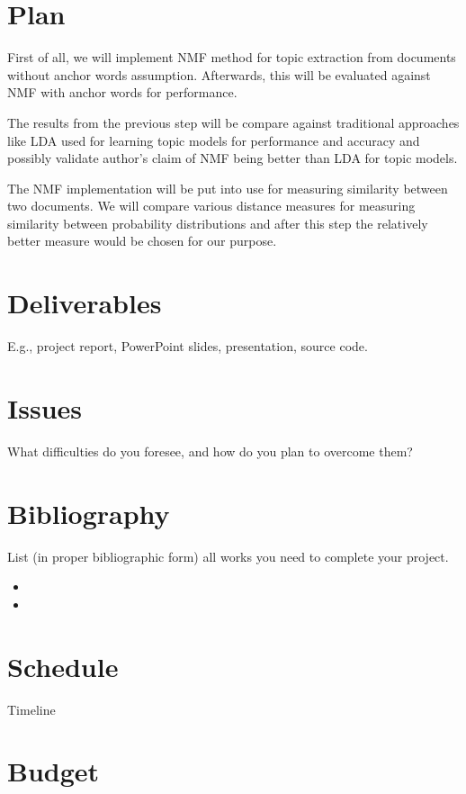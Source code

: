 \documentclass[a4paper,11pt]{article}
\begin{document}
\section{Plan}

First of all, we will implement NMF method for topic extraction from documents without anchor words assumption. Afterwards, this will be evaluated against NMF with anchor words for performance. 

The results from the previous step will be compare against traditional approaches like LDA used for learning topic models for performance and accuracy and possibly validate author's claim of NMF being better than LDA for topic models.

The NMF implementation will be put into use for measuring similarity between two documents. We will compare various distance measures for measuring similarity between probability distributions and after this step the relatively better measure would be chosen for our purpose.   

\section{Deliverables}

E.g., project report, PowerPoint slides, presentation, source code.

\section{Issues}
What difficulties do you foresee, and how do you plan to overcome them?

\section{Bibliography}
List (in proper bibliographic form) all works you need to complete your project.


\begin{itemize}
\item
\item
\end{itemize}  

\section{Schedule}

Timeline

\section{Budget}
\end{document}
